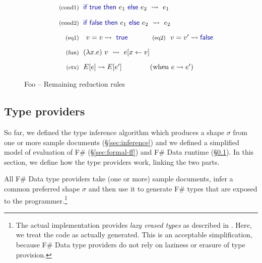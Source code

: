 \documentclass[10pt,preprint,blind,clearpagebib]{sigplanconf}
\newcommand{\kvd}[1]{\textnormal{\textcolor{kvdclr}{\sffamily #1}}}
\newcommand{\reduce}{\rightsquigarrow}
\begin{document}
\begin{figure}
\begin{equation*}
\begin{array}{rl}
 \\[-0.2em]
 \textnormal{\footnotesize{(cond1)}}&
 \hspace{-0.4em}
 \kvd{if}~\kvd{true}~\kvd{then}~e_1~\kvd{else}~e_2 ~\reduce~ e_1 \\
 \\[-0.2em]
 \textnormal{\footnotesize{(cond2)}}&
 \hspace{-0.4em}
 \kvd{if}~\kvd{false}~\kvd{then}~e_1~\kvd{else}~e_2 ~\reduce~ e_2 \\
 \\[-0.3em]
 \textnormal{\footnotesize{(eq1)}}&
 v=v\reduce\kvd{true} \qquad \textnormal{\footnotesize{(eq2)}}~~v=v'\reduce\kvd{false}\\
 \\[-0.3em]
 \textnormal{\footnotesize{(fun)}}&
 \hspace{-0.4em}
 (\lambda x.e)~v ~\reduce~ e[x\leftarrow v] \\
 \\[-0.3em]
 \textnormal{\footnotesize{(ctx)}}&
 \hspace{-0.4em}
  E[e] \reduce E[e'] \qquad\qquad(\textnormal{when}~e \reduce e')\\
\end{array}
\end{equation*}

\caption{Foo -- Remaining reduction rules}
\label{fig:ff-reduction}
\end{figure}


\subsection{Type providers}
\label{sec:formal-tp}

So far, we defined the type inference algorithm which produces a shape $\sigma$ from one 
or more sample documents (\S\ref{sec:inference}) and we defined a simplified model of evaluation
of F\# (\S\ref{sec:formal-ff}) and F\# Data runtime (\S\ref{sec:formal-tp}). In this section, we 
define how the type providers work, linking the two parts.

All F\# Data type providers take (one or more) sample documents, infer a common preferred shape $\sigma$
and then use it to generate F\# types that are exposed to the programmer.\footnote{The actual 
implementation provides \emph{lazy erased types} as described in \cite{fsharp-typeprov}. Here, we treat 
the code as actually generated. This is an acceptable simplification, because F\# Data type providers 
do not rely on laziness or erasure of type provision.}
\end{document}
